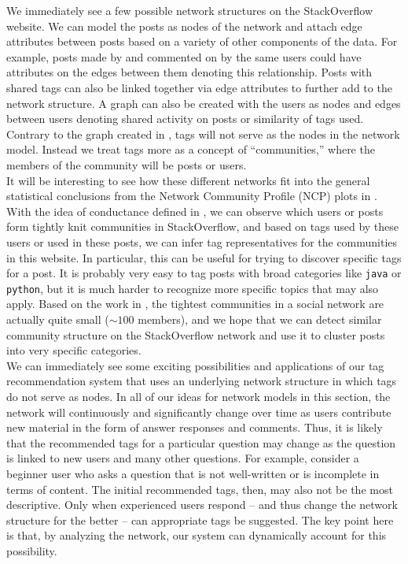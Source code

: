 \documentclass[11pt, final]{article}
\newcommand{\br}[1][.75]{\ \\[#1\baselineskip]}
\begin{document}
We immediately see a few possible network structures on the StackOverflow website. We can model the posts as nodes of the network and attach edge attributes between posts based on a variety of other components of the data. For example, posts made by and commented on by the same users could have attributes on the edges between them denoting this relationship. Posts with shared tags can also be linked together via edge attributes to further add to the network structure. A graph can also be created with the users as nodes and edges between users denoting shared activity on posts or similarity of tags used. Contrary to the graph created in \cite{5}, tags will not serve as the nodes in the network model. Instead we treat tags more as a concept of ``communities,'' where the members of the community will be posts or users.\br
It will be interesting to see how these different networks fit into the general statistical conclusions from the Network Community Profile (NCP) plots in \cite{4}. With the idea of conductance defined in \cite{4}, we can observe which users or posts form tightly knit communities in StackOverflow, and based on tags used by these users or used in these posts, we can infer tag representatives for the communities in this website. In particular, this can be useful for trying to discover specific tags for a post. It is probably very easy to tag posts with broad categories like \texttt{java} or \texttt{python}, but it is much harder to recognize more specific topics that may also apply. Based on the work in \cite{4}, the tightest communities in a social network are actually quite small ($\sim100$ members), and we hope that we can detect similar community structure on the StackOverflow network and use it to cluster posts into very specific categories.\br
We can immediately see some exciting possibilities and applications of our tag recommendation system that uses an underlying network structure in which tags do not serve as nodes. In all of our ideas for network models in this section, the network will continuously and significantly change over time as users contribute new material in the form of answer responses and comments. Thus, it is likely that the recommended tags for a particular question may change as the question is linked to new users and many other questions. For example, consider a beginner user who asks a question that is not well-written or is incomplete in terms of content. The initial recommended tags, then, may also not be the most descriptive. Only when experienced users respond -- and thus change the network structure for the better -- can appropriate tags be suggested. The key point here is that, by analyzing the network, our system can dynamically account for this possibility.
\end{document}
